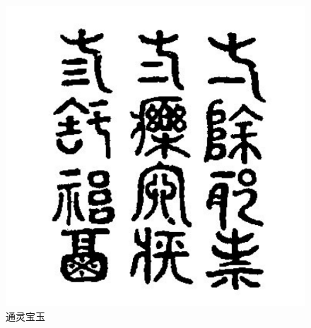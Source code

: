 \begin{figure}[htbp]
{\begin{minipage}{5cm}
			\includegraphics[scale=0.335]{../images/00019} %
		\end{minipage}
	}
	\caption{通灵宝玉} %
	\label{fig:1} %
\end{figure}
%
%
%
%
%
%
%
%
%

